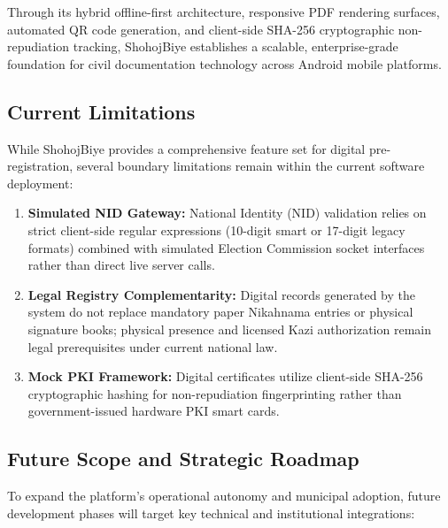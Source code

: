 \documentclass[12pt,a4paper]{article}
\begin{document}
	Through its hybrid offline-first architecture, responsive PDF rendering surfaces, automated QR code generation, and client-side SHA-256 cryptographic non-repudiation tracking, ShohojBiye establishes a scalable, enterprise-grade foundation for civil documentation technology across Android mobile platforms.
	
	\subsection{Current Limitations}
	While ShohojBiye provides a comprehensive feature set for digital pre-registration, several boundary limitations remain within the current software deployment:
	\begin{enumerate}
		\item \textbf{Simulated NID Gateway:} National Identity (NID) validation relies on strict client-side regular expressions (10-digit smart or 17-digit legacy formats) combined with simulated Election Commission socket interfaces rather than direct live server calls.
		\item \textbf{Legal Registry Complementarity:} Digital records generated by the system do not replace mandatory paper Nikahnama entries or physical signature books; physical presence and licensed Kazi authorization remain legal prerequisites under current national law.
		\item \textbf{Mock PKI Framework:} Digital certificates utilize client-side SHA-256 cryptographic hashing for non-repudiation fingerprinting rather than government-issued hardware PKI smart cards.
	\end{enumerate}
	
	\subsection{Future Scope and Strategic Roadmap}
	To expand the platform's operational autonomy and municipal adoption, future development phases will target key technical and institutional integrations:
	
\end{document}
